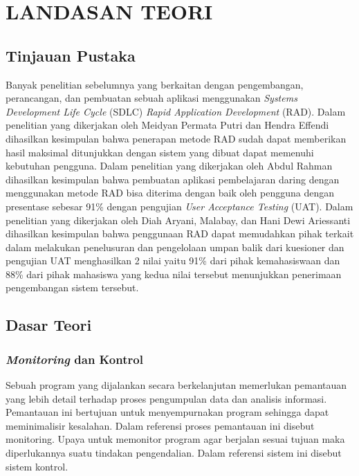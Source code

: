 \chapter{LANDASAN TEORI}

%
\vspace{4.5pt}

\begin{flushleft}
    \begin{justify}
        \section{Tinjauan Pustaka}
    Banyak penelitian sebelumnya yang berkaitan dengan pengembangan, perancangan, dan pembuatan sebuah aplikasi menggunakan
    \textit{Systems Development Life Cycle} (SDLC) \textit{Rapid Application Development} (RAD). Dalam penelitian yang dikerjakan oleh
    Meidyan Permata Putri dan Hendra Effendi \cite{web waterfall} dihasilkan kesimpulan bahwa penerapan metode RAD sudah dapat memberikan hasil maksimal ditunjukkan dengan sistem yang dibuat
    dapat memenuhi kebutuhan pengguna. Dalam penelitian yang dikerjakan oleh Abdul Rahman \cite{jurnal RAD UAT} dihasilkan kesimpulan bahwa pembuatan aplikasi pembelajaran daring dengan menggunakan metode RAD bisa diterima dengan baik oleh pengguna dengan presentase sebesar 91\% dengan pengujian \textit{User Acceptance Testing} (UAT).
    Dalam penelitian yang dikerjakan oleh Diah Aryani, Malabay, dan Hani Dewi Ariessanti \cite{jurnal RAD UAT 2} dihasilkan kesimpulan bahwa penggunaan RAD dapat memudahkan pihak terkait dalam melakukan penelusuran dan pengelolaan umpan balik dari kuesioner dan
    pengujian UAT menghasilkan 2 nilai yaitu 91\% dari pihak kemahasiswaan dan 88\% dari pihak mahasiswa yang kedua nilai tersebut menunjukkan penerimaan pengembangan sistem tersebut.

    \vspace{1cm}
    \section{Dasar Teori}

        \subsection{\textit{Monitoring} dan Kontrol}
        Sebuah program yang dijalankan secara berkelanjutan memerlukan pemantauan 
        yang lebih detail terhadap proses pengumpulan data dan analisis informasi. 
        Pemantauan ini bertujuan untuk menyempurnakan program sehingga dapat meminimalisir 
        kesalahan. Dalam referensi \cite{Monitoring} proses pemantauan ini disebut monitoring. 
        Upaya untuk memonitor program agar berjalan sesuai tujuan maka diperlukannya suatu 
        tindakan pengendalian. Dalam referensi \cite{Kontrol} sistem ini disebut sistem kontrol. 
        \\

\end{justify}
\end{flushleft}
